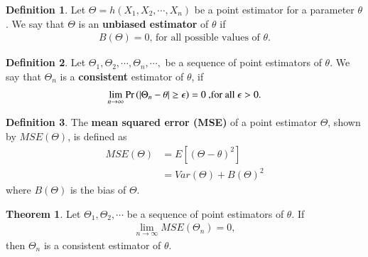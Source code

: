 \documentclass[journal,12pt,twocolumn]{IEEEtran}
\theoremstyle{definition}
\newtheorem{definition}{Definition}[section]
\newtheorem{theorem}{Theorem}[section]
\begin{document}
    \begin{definition}
    Let $\Theta = h(X_1,X_2, \cdots , X_n) $ be a point estimator for a parameter $ \theta $. We say that $ \Theta $ is an \textbf{unbiased estimator} of $ \theta $ if
    \begin{align}
       B(\Theta )= 0 \text{, for all possible values of $\theta$.}
    \end{align}
    \end{definition} 

\begin{definition}
Let $ \Theta_1,\Theta_2, \cdots, \Theta_n , \cdots, $  be a sequence of point estimators of $ \theta $. We say that $ \Theta_n $ is a \textbf{consistent} estimator of $ \theta $, if 
\begin{align}
    \lim_{n\to\infty} \Pr\left(| \Theta_n - \theta | \ge \epsilon\right) = 0 \text{ ,for all $ \epsilon > 0$.}
\end{align}
\end{definition}
\begin{definition}
The \textbf{mean squared error (MSE)} of a point estimator $ \Theta $, shown by $ MSE(\Theta) $, is defined as
\begin{align}
    MSE(\Theta ) &= E[(\Theta - \theta)^2] \\
    &= Var(\Theta) + B(\Theta)^2
\end{align}
where $ B(\Theta ) $ is the bias of $ \Theta $. 
\end{definition}    

\begin{theorem}
 Let $ \Theta_1,\Theta_2 , \cdots$ be a sequence of point estimators of $ \theta $. If
\begin{align}
     \lim_{n\to\infty} MSE( \Theta_n) = 0,
\end{align}
then $ \Theta_n $ is a consistent estimator of $ \theta$.
\end{theorem}
\end{document}
